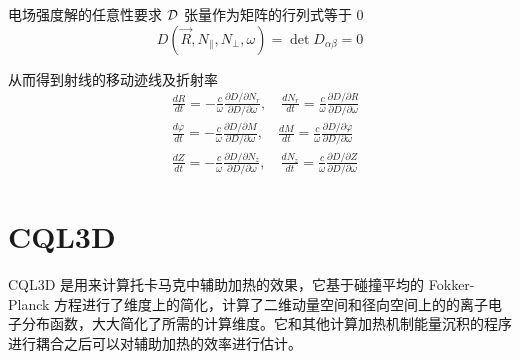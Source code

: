 电场强度解的任意性要求 $\mathcal{D}$ 张量作为矩阵的行列式等于 0
\begin{equation}D\left(\vec{R}, N_{\parallel}, N_{\perp}, \omega\right)=\operatorname{det} D_{\alpha \beta}=0\end{equation}

从而得到射线的移动迹线及折射率
\begin{equation}\begin{aligned}
  &\frac{d R}{d t}=-\frac{c}{\omega} \frac{\partial D / \partial N_{r}}{\partial D / \partial \omega}, \quad \frac{d N_{r}}{d t}=\frac{c}{\omega} \frac{\partial D / \partial R}{\partial D / \partial \omega}\\
  &\frac{d \varphi}{d t}=-\frac{c}{\omega} \frac{\partial D / \partial M}{\partial D / \partial \omega}, \quad \frac{d M}{d t}=\frac{c}{\omega} \frac{\partial D / \partial \varphi}{\partial D / \partial \omega}\\
  &\frac{d Z}{d t}=-\frac{c}{\omega} \frac{\partial D / \partial N_{z}}{\partial D / \partial \omega}, \quad \frac{d N_{z}}{d t}=\frac{c}{\omega} \frac{\partial D / \partial Z}{\partial D / \partial \omega}
  \end{aligned}\end{equation}

\section{CQL3D}
CQL3D 是用来计算托卡马克中辅助加热的效果，它基于碰撞平均的 Fokker-Planck 方程进行了维度上的简化，计算了二维动量空间和径向空间上的的离子电子分布函数，大大简化了所需的计算维度。它和其他计算加热机制能量沉积的程序进行耦合之后可以对辅助加热的效率进行估计。



